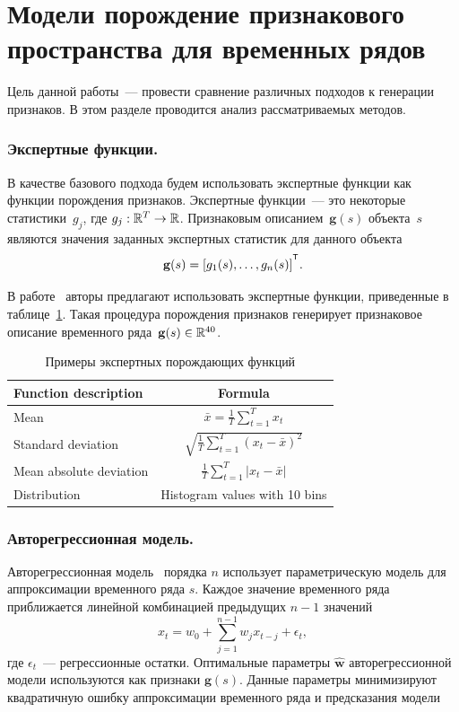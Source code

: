 \section{Модели порождение признакового пространства для временных рядов}

Цель данной работы~--- провести сравнение различных подходов к генерации признаков.
В этом разделе проводится анализ рассматриваемых методов.

\subsubsection{Экспертные функции.}
В качестве базового подхода будем использовать экспертные функции как функции порождения признаков.
Экспертные функции~--- это некоторые статистики~$g_j$, где $g_j: \mathbb{R}^T \rightarrow \mathbb{R}$.
Признаковым описанием~$\mathbf{g}(s)$ объекта~$s$ являются значения заданных экспертных статистик для данного объекта
\[
\mathbf{g}(s) = [g_1(s), \dots, g_n(s)]^{\T}.
\]

В работе~\cite{kwapisz2011activity} авторы предлагают использовать экспертные функции, приведенные в таблице~\ref{ch5:tbl:expert_functions}.
Такая процедура порождения признаков генерирует признаковое описание временного ряда~$\mathbf{g}(s) \in \mathbb{R}^{40}$.

\begin{table}[ht]
	\centering
	\caption{Примеры экспертных порождающих функций}
	\begin{tabular}{|l|c|}
		\hline
		\textbf{Function description}    & \textbf{Formula} \\ \hline
		Mean                    & $\bar{x} = \frac{1}{T} \sum_{t=1}^{T} x_t$    \\ \hline
		Standard deviation      & $\sqrt{\frac{1}{T} \sum_{t=1}^{T} (x_t - \bar{x})^2}$    \\ \hline
		Mean absolute deviation & $\frac{1}{T} \sum_{t=1}^{T} |x_t - \bar{x}|$    \\ \hline
		Distribution            &  Histogram values with 10 bins    \\ \hline
	\end{tabular}
	\label{ch5:tbl:expert_functions}
\end{table}

\subsubsection{Авторегрессионная модель.}
Авторегрессионная модель~\cite{lukashin2003adaptive} порядка $n$
использует параметрическую модель для аппроксимации временного ряда $s$. 
Каждое значение временного ряда приближается линейной комбинацией предыдущих $n-1$ значений
\begin{equation*}
x_t = w_0 + \sum_{j=1}^{n-1} w_j x_{t-j} + \epsilon_t,
\end{equation*}
где $\epsilon_t$~--- регрессионные остатки.
Оптимальные параметры $\hat{\mathbf{w}}$ авторегрессионной модели используются как признаки $\mathbf{g}(s)$.
Данные параметры минимизируют квадратичную ошибку аппроксимации временного ряда и предсказания модели

